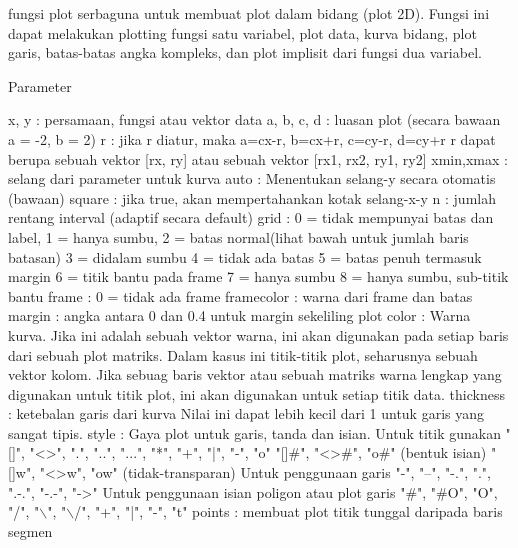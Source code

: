 \documentclass[a4paper,10pt]{article}
\begin{document}
\begin{eulernotebook}
\begin{eulercomment}
\begin{eulercomment}
\begin{eulercomment}
\begin{eulercomment}
\begin{eulercomment}
fungsi plot serbaguna untuk membuat plot dalam bidang (plot 2D).
Fungsi ini dapat melakukan plotting fungsi satu variabel, plot data,
kurva bidang, plot garis, batas-batas angka kompleks, dan plot
implisit dari fungsi dua variabel.

Parameter\\
\end{eulercomment}
\begin{eulerttcomment}
 x, y       : persamaan, fungsi atau vektor data
 a, b, c, d : luasan plot (secara bawaan a = -2, b = 2)
 r          : jika r diatur, maka a=cx-r, b=cx+r, c=cy-r, d=cy+r
              r dapat berupa sebuah vektor [rx, ry] atau sebuah vektor
              [rx1, rx2, ry1, ry2]
 xmin,xmax  : selang dari parameter untuk kurva
 auto       : Menentukan selang-y secara otomatis (bawaan)
 square     : jika true, akan mempertahankan kotak selang-x-y
 n          : jumlah rentang interval (adaptif secara default)
 grid       : 0 = tidak mempunyai batas dan label,
              1 = hanya sumbu,
              2 = batas normal(lihat bawah untuk jumlah baris batasan)
              3 = didalam sumbu
              4 = tidak ada batas
              5 = batas penuh termasuk margin
              6 = titik bantu pada frame
              7 = hanya sumbu
              8 = hanya sumbu, sub-titik bantu
 frame      : 0 = tidak ada frame
 framecolor : warna dari frame dan batas
 margin     : angka antara 0 dan 0.4 untuk margin sekeliling plot
 color      : Warna kurva. Jika ini adalah sebuah vektor warna, ini
              akan digunakan pada setiap baris dari sebuah plot
              matriks.
              Dalam kasus ini titik-titik plot, seharusnya sebuah
              vektor kolom. Jika sebuag baris vektor atau sebuah
              matriks warna lengkap yang digunakan untuk titik plot,
              ini akan digunakan untuk setiap titik data.
 thickness  : ketebalan garis dari kurva
              Nilai ini dapat lebih kecil dari 1 untuk garis yang
              sangat tipis.
 style      : Gaya plot untuk garis, tanda dan isian.
              Untuk titik gunakan
             "[]", "<>", ".", "..", "...",
             "*", "+", "|", "-", "o"
             "[]#", "<>#", "o#" (bentuk isian)
             "[]w", "<>w", "ow" (tidak-transparan)
             Untuk penggunaan garis
             "-", "--", "-.", ".", ".-.", "-.-", "->"
             Untuk penggunaan isian poligon atau plot garis
             "#", "#O", "O", "/", "\(\backslash\)", "\(\backslash\)/",
             "+", "|", "-", "t"
 points    : membuat plot titik tunggal daripada baris segmen

\end{eulerttcomment}
\end{eulercomment}
\end{eulercomment}
\end{eulercomment}
\end{eulercomment}
\end{eulernotebook}
\end{document}
